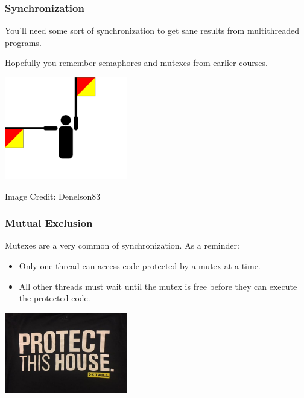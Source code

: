 \begin{frame}
\frametitle{Synchronization}

You'll need some sort of synchronization to get sane results from
multithreaded programs. 

Hopefully you remember semaphores and mutexes from earlier courses.

\begin{center}
	\includegraphics[width=0.4\textwidth]{images/Semaphore_Papa.png}
\end{center}
\hfill Image Credit: Denelson83

\end{frame}


\begin{frame}
\frametitle{Mutual Exclusion}

Mutexes are a very common of synchronization.
As a reminder:
    \begin{itemize}
    \item Only one thread can access code protected by a mutex at a time.
    \item All other threads must wait until the mutex is free before they can
      execute the protected code.
    \end{itemize}

\begin{center}
	\includegraphics[width=0.4\textwidth]{images/protect-house.jpg}
\end{center}

\end{frame}


